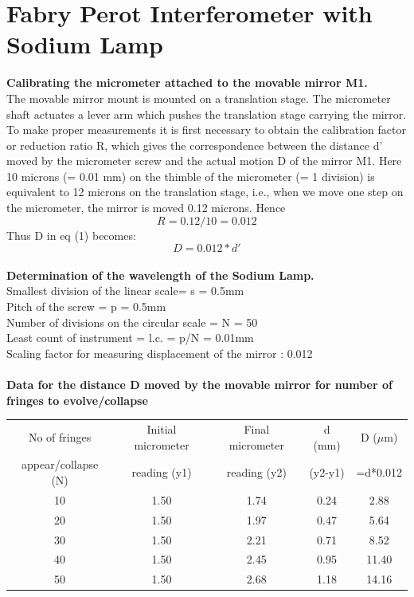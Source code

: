 \documentclass[12pt]{report}
\begin{document}
	\section{Fabry Perot Interferometer with Sodium Lamp}
	\textbf{Calibrating the micrometer attached to the movable mirror M1.}\\
	The movable mirror mount is mounted on a translation stage. The micrometer shaft
	actuates a lever arm which pushes the translation stage carrying the mirror. To make
	proper measurements it is first necessary to obtain the calibration factor or reduction ratio
	R, which gives the correspondence between the distance d’ moved by the micrometer
	screw and the actual motion D of the mirror M1.
	Here 10 microns (= 0.01 mm) on the thimble of the micrometer (= 1 division) is equivalent
	to 12 microns on the translation stage, i.e., when we move one step on the micrometer, the
	mirror is moved 0.12 microns. Hence
	$$R=0.12/10=0.012$$
	Thus D in eq (1) becomes:
	$$D=0.012*d'$$\\
	\textbf{Determination of the wavelength of the Sodium Lamp.}\\
	Smallest division of the linear scale= s = 0.5mm\\
	Pitch of the screw = p = 0.5mm\\
	Number of divisions on the circular scale = N = 50\\
	Least count of instrument = l.c. = p/N = 0.01mm\\
	Scaling factor for measuring displacement of the mirror : 0.012\\ \\
	\textbf{Data for the distance D moved by the movable mirror for number of fringes to evolve/collapse}
	\begin{center}
		\begin{tabular}{ |c|c|c|c|c| } 
			\hline
			No of fringes &Initial micrometer&Final micrometer& d (mm) & D ($\mu$m)\\
			appear/collapse (N)&reading (y1) &reading (y2)&(y2-y1)& =d*0.012\\
			\hline
			10 & 1.50 & 1.74 & 0.24 & 2.88  \\
			20 & 1.50 & 1.97 & 0.47 & 5.64  \\
			30 & 1.50 & 2.21 & 0.71 & 8.52  \\
			40 & 1.50 & 2.45 & 0.95 & 11.40 \\
			50 & 1.50 & 2.68 & 1.18 & 14.16 \\
			\hline
		\end{tabular}
		\\
	\end{center}
\end{document}

